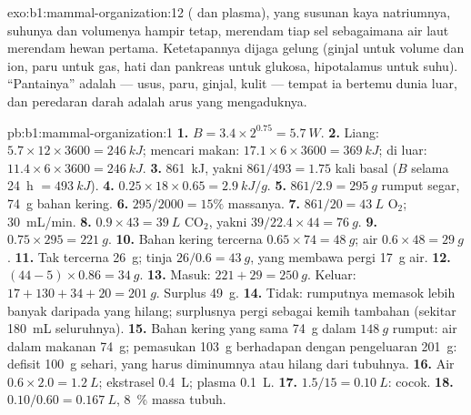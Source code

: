 \begin{solution}{exo:b1:mammal-organization:12}
 ( dan plasma), yang susunan kaya
natriumnya, suhunya dan volumenya hampir tetap, merendam tiap sel
sebagaimana air laut merendam hewan pertama. Ketetapannya dijaga
gelung  (ginjal untuk volume dan ion, paru untuk gas,
hati dan pankreas untuk glukosa, hipotalamus untuk suhu). ``Pantainya''
adalah  --- usus, paru, ginjal, kulit --- tempat ia
bertemu dunia luar, dan peredaran darah adalah arus yang mengaduknya.
\end{solution}

\begin{solution}{pb:b1:mammal-organization:1}
\textbf{1.} $B = 3.4\times 2^{0.75} = \qty{5.7}{W}$.
\textbf{2.} Liang: $5.7\times 12\times 3600 = \qty{246}{kJ}$; mencari
makan: $17.1\times 6\times 3600 = \qty{369}{kJ}$; di luar:
$11.4\times 6\times 3600 = \qty{246}{kJ}$.
\textbf{3.} \qty{861}{kJ}, yakni $861/493 = 1.75$ kali basal
($B$ selama \qty{24}{h} $= \qty{493}{kJ}$).
\textbf{4.} $0.25\times 18\times 0.65 = \qty{2.9}{kJ/g}$.
\textbf{5.} $861/2.9 = \qty{295}{g}$ rumput segar, \qty{74}{g} bahan
kering.
\textbf{6.} $295/2000 = 15\%$ massanya.
\textbf{7.} $861/20 = \qty{43}{L}$ $\mathrm{O_2}$; \qty{30}{mL/min}.
\textbf{8.} $0.9\times 43 = \qty{39}{L}$ $\mathrm{CO_2}$, yakni $39/22.4\times 44 = \qty{76}{g}$.
\textbf{9.} $0.75\times 295 = \qty{221}{g}$.
\textbf{10.} Bahan kering tercerna $0.65\times 74 = \qty{48}{g}$; air
$0.6\times 48 = \qty{29}{g}$.
\textbf{11.} Tak tercerna \qty{26}{g}; tinja $26/0.6 = \qty{43}{g}$,
yang membawa pergi \qty{17}{g} air.
\textbf{12.} $(44 - 5)\times 0.86 = \qty{34}{g}$.
\textbf{13.} Masuk: $221 + 29 = \qty{250}{g}$. Keluar: $17 + 130 + 34 + 20
= \qty{201}{g}$. Surplus \qty{49}{g}.
\textbf{14.} Tidak: rumputnya memasok lebih banyak daripada yang
hilang; surplusnya pergi sebagai kemih tambahan (sekitar \qty{180}{mL}
seluruhnya).
\textbf{15.} Bahan kering yang sama \qty{74}{g} dalam $\qty{148}{g}$
rumput: air dalam makanan \qty{74}{g}; pemasukan \qty{103}{g}
berhadapan dengan pengeluaran \qty{201}{g}: defisit \qty{100}{g} sehari,
yang harus diminumnya atau hilang dari tubuhnya.
\textbf{16.} Air $0.6\times 2.0 = \qty{1.2}{L}$; ekstrasel
\qty{0.4}{L}; plasma \qty{0.1}{L}.
\textbf{17.} $1.5/15 = \qty{0.10}{L}$: cocok.
\textbf{18.} $0.10/0.60 = \qty{0.167}{L}$, \qty{8}{\%} massa tubuh.

\end{solution}
